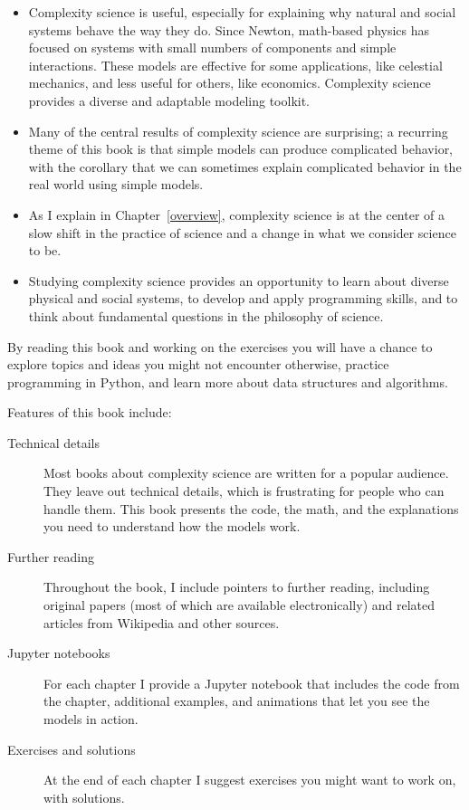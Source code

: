 \documentclass[12pt]{book}
\theoremstyle{exercise}
\begin{document}
\begin{itemize}

\item Complexity science is useful, especially for explaining why natural and social systems behave the way they do.  Since Newton, math-based physics has focused on systems with small numbers of components and simple interactions.  These models are effective for some applications, like celestial mechanics, and less useful for others, like economics.  Complexity science provides a diverse and adaptable modeling toolkit. 

\item Many of the central results of complexity science are surprising; a recurring theme of this book is that simple models can produce complicated behavior, with the corollary that we can sometimes explain complicated behavior in the real world using simple models.

\item As I explain in Chapter~\ref{overview}, complexity science is at the center of a slow shift in the practice of science and a change in what we consider science to be.

\item Studying complexity science provides an opportunity to learn about diverse physical and social systems, to develop and apply programming skills, and to think about fundamental questions in the philosophy of science.

\end{itemize}

By reading this book and working on the exercises you will have a chance to explore topics and ideas you might not encounter otherwise, practice programming in Python, and learn more about data structures and algorithms.

Features of this book include:

\begin{description}

\item[Technical details] Most books about complexity science
  are written for a popular audience.  They leave out
  technical details, which is frustrating for people who can handle
  them.  This book presents the code, the math, and the explanations
  you need to understand how the models work.

\item[Further reading] Throughout the book, I include pointers to
  further reading, including original papers (most of which are
  available electronically) and related articles from Wikipedia and
  other sources.

\item[Jupyter notebooks] For each chapter I provide a Jupyter notebook
  that includes the code from the chapter, additional examples, and
  animations that let you see the models in action.

\item[Exercises and solutions] At the end of each chapter I suggest
  exercises you might want to work on, with solutions.

\end{description}
\end{document}
